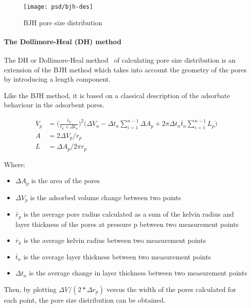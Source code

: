 \begin{figure}[!htb]
	\centering
	\texttt{[image: psd/bjh-des]}
	\caption{BJH pore size distribution}%
	\label{pyg:fgr:bjhplot}
\end{figure}

\paragraph{The Dollimore-Heal (DH) method}

The DH or Dollimore-Heal
method~\cite{dollimorePoresizeDistributionTypical1970}
of calculating pore size distribution is an
extension of the BJH method which takes into account the
geometry of the pores by introducing a length component.

Like the BJH method, it is based on a classical description of
the adsorbate behaviour in the adsorbent pores.

\begin{align}
	V_p & = \Big(\frac{\bar{r}_p}{\bar{r}_k + \Delta t_n}\Big)^2
	\Big(\Delta V_n - \Delta t_n \sum_{i=1}^{n-1} \Delta A_p
	+ 2 \pi \Delta t_n \bar{t}_n \sum_{i=1}^{n-1} L_p\Big)       \\
	A   & = 2 \Delta V_p / r_p                                   \\
	L   & = \Delta A_p / 2 \pi r_p
\end{align}

Where:
\begin{itemize}

	\item \(\Delta A_p\) is the area of the pores
	\item \(\Delta V_p\) is the adsorbed volume change between two points
	\item \(\bar{r}_p\) is the average pore radius calculated as a sum of the
	      kelvin radius and layer thickness of the pores at pressure p between two
	      measurement points
	\item \(\bar{r}_k\) is the average kelvin radius between two measurement points
	\item \(\bar{t}_n\) is the average layer thickness between two measurement points
	\item \(\Delta t_n\) is the average change in layer thickness between two measurement points
\end{itemize}

Then, by plotting \(\Delta V/(2*\Delta r_p)\) versus the width of the pores calculated
for each point, the pore size distribution can be obtained.

